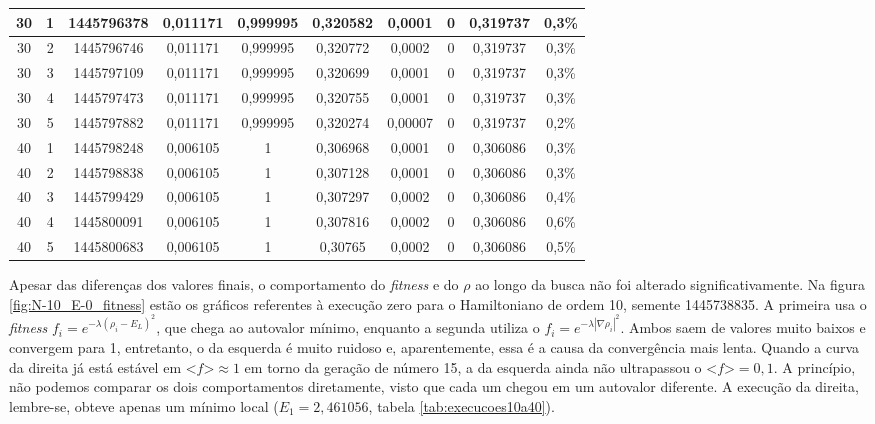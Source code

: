 \begin{landscape}
\begin{center}
\begin{table}[htbp]
\begin{tabular}{cccccccccc}
\hline
        30 &          1 & 1445796378 &   0,011171 &   0,999995 &   0,320582 &     0,0001 &          0 &   0,319737 &      0,3\% \\
\hline
        30 &          2 & 1445796746 &   0,011171 &   0,999995 &   0,320772 &     0,0002 &          0 &   0,319737 &      0,3\% \\
\hline
        30 &          3 & 1445797109 &   0,011171 &   0,999995 &   0,320699 &     0,0001 &          0 &   0,319737 &      0,3\% \\
\hline
        30 &          4 & 1445797473 &   0,011171 &   0,999995 &   0,320755 &     0,0001 &          0 &   0,319737 &      0,3\% \\
\hline
        30 &          5 & 1445797882 &   0,011171 &   0,999995 &   0,320274 &    0,00007 &          0 &   0,319737 &      0,2\% \\
\hline
        40 &          1 & 1445798248 &   0,006105 &          1 &   0,306968 &     0,0001 &          0 &   0,306086 &      0,3\% \\
\hline
        40 &          2 & 1445798838 &   0,006105 &          1 &   0,307128 &     0,0001 &          0 &   0,306086 &      0,3\% \\
\hline
        40 &          3 & 1445799429 &   0,006105 &          1 &   0,307297 &     0,0002 &          0 &   0,306086 &      0,4\% \\
\hline
        40 &          4 & 1445800091 &   0,006105 &          1 &   0,307816 &     0,0002 &          0 &   0,306086 &      0,6\% \\
\hline
        40 &          5 & 1445800683 &   0,006105 &          1 &    0,30765 &     0,0002 &          0 &   0,306086 &      0,5\% \\

\hline \hline
\end{tabular}
\end{table}  
\end{center}
\end{landscape}
	
	Apesar das diferenças dos valores finais, o comportamento do \textit{fitness} e do $\rho$ ao longo da busca não foi alterado significativamente. Na figura \ref{fig:N-10_E-0_fitness} estão os gráficos referentes à execução zero para o Hamiltoniano de ordem 10, semente 1445738835. A primeira usa o \textit{fitness} $f_i = e^{-\lambda(\rho_i - E_L)^2}$, que chega ao autovalor mínimo, enquanto a segunda utiliza o $f_i = e^{-\lambda | \nabla \rho_i |^2}$. Ambos saem de valores muito baixos e convergem para 1, entretanto, o da esquerda é muito ruidoso e, aparentemente, essa é a causa da convergência mais lenta. Quando a curva da direita já está estável em $\textit{<f>} \approx 1$ em torno da geração de número 15, a da esquerda ainda não ultrapassou o $\textit{<f>} = 0,1$. A princípio, não podemos comparar os dois comportamentos diretamente, visto que cada um chegou em um autovalor diferente. A execução da direita, lembre-se, obteve apenas um mínimo local ($E_1 = 2,461056$, tabela \ref{tab:execucoes10a40}).
	

